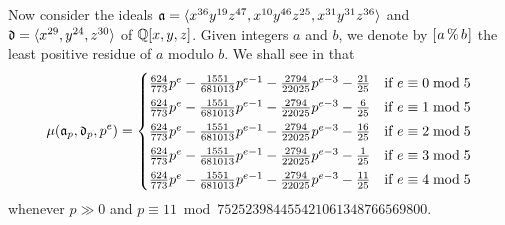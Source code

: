 \documentclass{amsart}
\begin{document}
\begin{example}
   \label{ex2 intro}
   Now consider the ideals $\mathfrak{a} = \langle x^{36} y^{19} z^{47}, x^{10} y^{46} z^{25}, x^{31} y^{31} z^{36} \rangle$ and $\mathfrak{d} = \langle x^{29},y^{24},z^{30} \rangle$ of $\mathbb{Q}[x,y,z]$.
   Given integers $a$ and $b$, we denote by $[ \hspace{.01in} a \, \% \, b \hspace{.01in} ]$ the least positive residue of $a$ modulo $b$.
   We shall see in  that
%
   \[
    \mu(\mathfrak{a}_p,\mathfrak{d}_p,p^e) =
    \begin{cases}
       \frac{624}{773}p^{e} - \frac{1551}{681013}p^{e-1} - \frac{2794}{22025}p^{e-3} - \frac{21}{25} & \text{if $e \equiv 0 \bmod 5$}\\[1mm]
       \frac{624}{773}p^{e} - \frac{1551}{681013}p^{e-1} - \frac{2794}{22025}p^{e-3} - \frac{6}{25} & \text{if $e \equiv 1 \bmod 5$}\\[1mm]
       \frac{624}{773}p^{e} - \frac{1551}{681013}p^{e-1} - \frac{2794}{22025}p^{e-3} - \frac{16}{25} & \text{if $e \equiv 2 \bmod 5$}\\[1mm]
       \frac{624}{773}p^{e} - \frac{1551}{681013}p^{e-1} - \frac{2794}{22025}p^{e-3} - \frac{1}{25} & \text{if $e \equiv 3 \bmod 5$}\\[1mm]
       \frac{624}{773}p^{e} - \frac{1551}{681013}p^{e-1} - \frac{2794}{22025}p^{e-3} - \frac{11}{25} & \text{if $e \equiv 4 \bmod 5$}
    \end{cases}
 \]
 whenever $p \gg 0$  and $p \equiv 11 \bmod 752523984455421061348766569800$.
\end{example}
\end{document}
